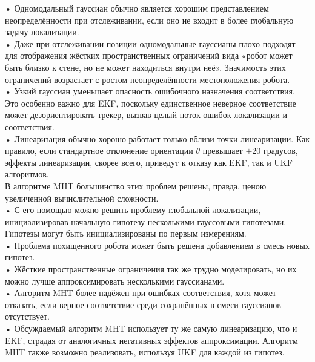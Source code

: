 \documentclass[10pt,a4paper]{article}
\begin{document}
• Одномодальный гауссиан обычно является хорошим представлением неопределённости при отслеживании, если оно не входит в более глобальную задачу локализации.\\

• Даже при отслеживании позиции одномодальные гауссианы плохо подходят для отображения жёстких пространственных ограничений вида «робот может быть близко к стене, но не может находиться внутри неё». Значимость этих ограничений возрастает с ростом неопределённости местоположения робота.\\

• Узкий гауссиан уменьшает опасность ошибочного назначения соответствия. Это особенно важно для EKF, поскольку единственное неверное соответствие может дезориентировать трекер, вызвав целый поток ошибок локализации и соответствия. \\

• Линеаризация обычно хорошо работает только вблизи точки линеаризации. Как правило, если стандартное отклонение ориентации $\theta$ превышает $\pm20$ градусов, эффекты линеаризации, скорее всего, приведут к отказу как EKF, так и UKF алгоритмов.\\

В алгоритме MHT большинство этих проблем решены, правда, ценою увеличенной вычислительной сложности.\\

• С его помощью можно решить проблему глобальной локализации, инициализировав начальную гипотезу несколькими гауссовыми гипотезами. Гипотезы могут быть инициализированы по первым измерениям.\\

• Проблема похищенного робота может быть решена добавлением в смесь новых гипотез.\\

• Жёсткие пространственные ограничения так же трудно моделировать, но их можно лучше аппроксимировать несколькими гауссианами. \\

• Алгоритм MHT более надёжен при ошибках соответствия, хотя может отказать, если верное соответствие среди сохранённых в смеси гауссианов отсутствует.\\

• Обсуждаемый алгоритм MHT использует ту же самую линеаризацию, что и EKF, страдая от аналогичных негативных эффектов аппроксимации. Алгоритм MHT также возможно реализовать, используя UKF для каждой из гипотез.\\
\end{document}
